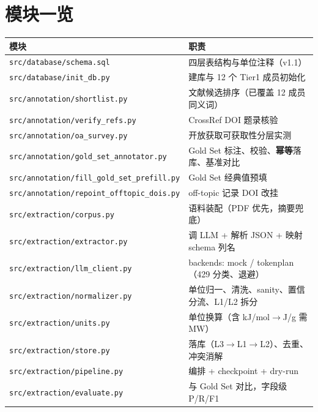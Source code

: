 \documentclass[11pt,a4paper]{ctexart}
\begin{document}
\section{模块一览}
\begin{table}[htbp]
\centering
\footnotesize
\begin{tabularx}{\textwidth}{l X}
\toprule
模块 & 职责 \\
\midrule
\texttt{src/database/schema.sql} & 四层表结构与单位注释（v1.1） \\
\texttt{src/database/init\_db.py} & 建库与 12 个 Tier1 成员初始化 \\
\texttt{src/annotation/shortlist.py} & 文献候选排序（已覆盖 12 成员同义词） \\
\texttt{src/annotation/verify\_refs.py} & CrossRef DOI 题录核验 \\
\texttt{src/annotation/oa\_survey.py} & 开放获取可获取性分层实测 \\
\texttt{src/annotation/gold\_set\_annotator.py} & Gold Set 标注、校验、\textbf{幂等}落库、基准对比 \\
\texttt{src/annotation/fill\_gold\_set\_prefill.py} & Gold Set 经典值预填 \\
\texttt{src/annotation/repoint\_offtopic\_dois.py} & off-topic 记录 DOI 改挂 \\
\texttt{src/extraction/corpus.py} & 语料装配（PDF 优先，摘要兜底） \\
\texttt{src/extraction/extractor.py} & 调 LLM + 解析 JSON + 映射 schema 列名 \\
\texttt{src/extraction/llm\_client.py} & backends: mock / tokenplan（429 分类、退避） \\
\texttt{src/extraction/normalizer.py} & 单位归一、清洗、sanity、置信分流、L1/L2 拆分 \\
\texttt{src/extraction/units.py} & 单位换算（含 kJ/mol$\to$J/g 需 MW） \\
\texttt{src/extraction/store.py} & 落库（L3$\to$L1$\to$L2）、去重、冲突消解 \\
\texttt{src/extraction/pipeline.py} & 编排 + checkpoint + dry-run \\
\texttt{src/extraction/evaluate.py} & 与 Gold Set 对比，字段级 P/R/F1 \\
\bottomrule
\end{tabularx}
\end{table}
\end{document}
